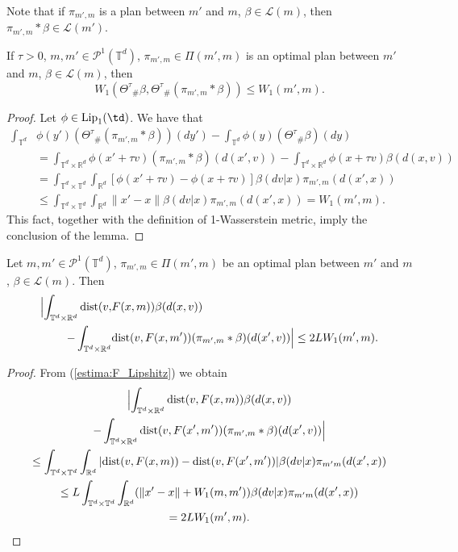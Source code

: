 \documentclass[12pt]{article}
\newcommand{\ptd}{\mathcal{P}^1(\mathbb{T}^d)}
\newcommand{\inttd}{\int_{\mathbb{T}^d}}
\newcommand{\inttdtd}{\int_{\mathbb{T}^d\times \mathbb{T}^d}}
\newcommand{\intrd}{\int_{\mathbb{R}^d}}
\newcommand{\inttrd}{\int_{\mathbb{T}^d\times \mathbb{R}^d}}
\begin{document}
Note that if $\pi_{m',m}$ is a plan between $m'$ and $m$, $\beta\in\mathcal{L}(m)$, then $\pi_{m',m}*\beta\in \mathcal{L}(m')$.

\begin{lemma}\label{lm:transfer_Theta} If $\tau>0$, $m,m'\in\ptd$, $\pi_{m',m}\in \Pi(m',m)$ is an optimal plan between $m'$ and $m$,  $\beta\in\mathcal{L}(m)$, then
	$$W_1(\Theta^\tau{}_\#\beta,\Theta^\tau{}_\#(\pi_{m',m}*\beta))\leq W_1(m',m). $$
\end{lemma}
\begin{proof}
	Let $\phi\in \mathrm{Lip}_1(\td)$. We have that
	\begin{equation*}
	\begin{split}
	\inttd&\phi(y')(\Theta^\tau{}_\#(\pi_{m',m}*\beta))(dy')- \inttd\phi(y)(\Theta^\tau{}_\#\beta)(dy)\\&=
	\inttrd \phi(x'+\tau v)(\pi_{m',m}*\beta)(d(x',v))-\inttrd \phi(x+\tau v)\beta(d(x,v))\\&=
	\inttdtd\intrd[\phi(x'+\tau v)-\phi(x+\tau v)]\beta(dv|x)\pi_{m',m}(d(x',x))\\ &\leq 
	\inttdtd\intrd\|x'-x\|\beta(dv|x)\pi_{m',m}(d(x',x))=W_1(m',m).
	\end{split}
	\end{equation*} This fact, together with the definition of 1-Wasserstein metric, imply the conclusion of the lemma. 
\end{proof}

\begin{lemma}\label{lm:distance_F}
	Let $m,m'\in\ptd$, $\pi_{m',m}\in \Pi(m',m)$ be an optimal plan between $m'$ and $m$,  $\beta\in\mathcal{L}(m)$. Then
	\begin{equation*}\begin{split}\Bigl|\inttrd\mathrm{dist}(v,&F(x,m))\beta(d(x,v))\\- \inttrd&\mathrm{dist}(v,F(x,m'))(\pi_{m',m}*\beta)(d(x',v))\Bigr| \leq 2LW_1(m',m). \end{split}\end{equation*}
\end{lemma}
\begin{proof}
	From (\ref{estima:F_Lipshitz}) we obtain
	\begin{multline*}
	\Bigl|\inttrd\mathrm{dist}(v,F(x,m))\beta(d(x,v))\\- \inttrd\mathrm{dist}(v,F(x',m'))(\pi_{m',m}*\beta)(d(x',v))\Bigr|\\\leq
	\inttdtd\intrd|\mathrm{dist}(v,F(x,m))-\mathrm{dist}(v,F(x',m'))|\beta(dv|x)\pi_{m'm}(d(x',x))\\ \leq L\inttdtd\intrd(\|x'-x\|+W_1(m,m'))\beta(dv|x)\pi_{m'm}(d(x',x))\\=  2LW_1(m',m).
	\end{multline*}
\end{proof}
\end{document}
